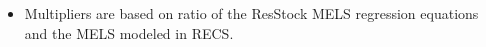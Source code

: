 \begin{itemize}
\item Multipliers are based on ratio of the ResStock MELS regression equations and the MELS modeled in RECS.
\end{itemize}
